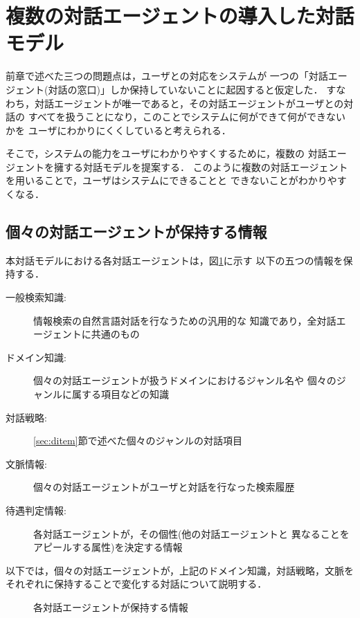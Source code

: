\section{複数の対話エージェントの導入した対話モデル}\label{sec:multia}

前章で述べた三つの問題点は，ユーザとの対応をシステムが
一つの「対話エージェント(対話の窓口)」しか保持していないことに起因すると仮定した．
すなわち，対話エージェントが唯一であると，その対話エージェントがユーザとの対話の
すべてを扱うことになり，このことでシステムに何ができて何ができないかを
ユーザにわかりにくくしていると考えられる．

そこで，システムの能力をユーザにわかりやすくするために，複数の
対話エージェントを擁する対話モデルを提案する．
このように複数の対話エージェントを用いることで，ユーザはシステムにできることと
できないことがわかりやすくなる．

\subsection{個々の対話エージェントが保持する情報}

本対話モデルにおける各対話エージェントは，図\ref{fig:eachagent}に示す
以下の五つの情報を保持する．
\begin{description}
\item[一般検索知識:] 情報検索の自然言語対話を行なうための汎用的な
知識であり，全対話エージェントに共通のもの
\item[ドメイン知識:] 個々の対話エージェントが扱うドメインにおけるジャンル名や
個々のジャンルに属する項目などの知識
\item[対話戦略:] \ref{sec:ditem}節で述べた個々のジャンルの対話項目
\item[文脈情報:] 個々の対話エージェントがユーザと対話を行なった検索履歴
\item[待遇判定情報:] 各対話エージェントが，その個性(他の対話エージェントと
異なることをアピールする属性)を決定する情報\cite{taiguu}
\end{description}
以下では，個々の対話エージェントが，上記のドメイン知識，対話戦略，文脈を
それぞれに保持することで変化する対話について説明する．

\begin{figure}[hp]
\begin{center}
\end{center}
\caption{各対話エージェントが保持する情報}\label{fig:eachagent}
\end{figure}

